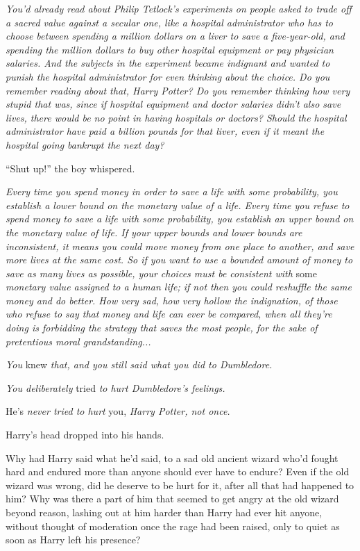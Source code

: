 \emph{You'd already read about Philip Tetlock's experiments on people asked to trade off a sacred value against a secular one, like a hospital administrator who has to choose between spending a million dollars on a liver to save a five-year-old, and spending the million dollars to buy other hospital equipment or pay physician salaries. And the subjects in the experiment became indignant and wanted to punish the hospital administrator for even thinking about the choice. Do you remember reading about that, Harry Potter? Do you remember thinking how very stupid that was, since if hospital equipment and doctor salaries didn't also save lives, there would be no point in having hospitals or doctors? Should the hospital administrator have paid a billion pounds for that liver, even if it meant the hospital going bankrupt the next day?}

``Shut up!'' the boy whispered.

\emph{Every time you spend money in order to save a life with some probability, you establish a lower bound on the monetary value of a life. Every time you refuse to spend money to save a life with some probability, you establish an upper bound on the monetary value of life. If your upper bounds and lower bounds are inconsistent, it means you could move money from one place to another, and save more lives at the same cost. So if you want to use a bounded amount of money to save as many lives as possible, your choices must be consistent with} some \emph{monetary value assigned to a human life; if not then you could reshuffle the same money and do better. How very sad, how very hollow the indignation, of those who refuse to say that money and life can ever be compared, when all they're doing is forbidding the strategy that saves the most people, for the sake of pretentious moral grandstanding...}

\emph{You} knew \emph{that, and you still said what you did to Dumbledore.}

\emph{You deliberately} tried \emph{to hurt Dumbledore's feelings.}

He's \emph{never tried to hurt} you, \emph{Harry Potter, not once.}

Harry's head dropped into his hands.

Why had Harry said what he'd said, to a sad old ancient wizard who'd fought hard and endured more than anyone should ever have to endure? Even if the old wizard was wrong, did he deserve to be hurt for it, after all that had happened to him? Why was there a part of him that seemed to get angry at the old wizard beyond reason, lashing out at him harder than Harry had ever hit anyone, without thought of moderation once the rage had been raised, only to quiet as soon as Harry left his presence?

